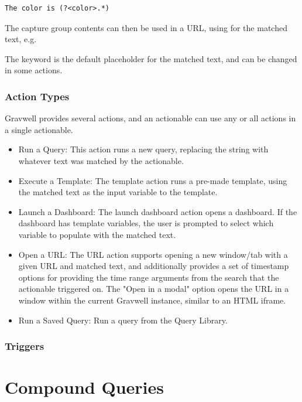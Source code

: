 \begin{verbatim}
The color is (?<color>.*)
\end{verbatim}

The capture group contents can then be used in a URL, using  for the matched text, e.g. 

The keyword  is the default placeholder for the matched text, and can be changed in some actions.

\subsubsection{Action Types}

Gravwell provides several actions, and an actionable can use any or all actions in a single actionable. 

\begin{itemize}
\item Run a Query: This action runs a new query, replacing the string  with whatever text was matched by the actionable.
\item Execute a Template: The template action runs a pre-made template, using the matched text as the input variable to the template. 
\item Launch a Dashboard: The launch dashboard action opens a dashboard. If the dashboard has template variables, the user is prompted to select which variable to populate with the matched text.
\item Open a URL: The URL action supports opening a new window/tab with a given URL and matched text, and additionally provides a set of timestamp options for providing the time range arguments from the search that the actionable triggered on.  The "Open in a modal" option opens the URL in a window within the current Gravwell instance, similar to an HTML iframe.
\item Run a Saved Query: Run a query from the Query Library. 
\end{itemize}


\subsubsection{Triggers}

\section{Compound Queries}
\label{sec:compoundqueries}

